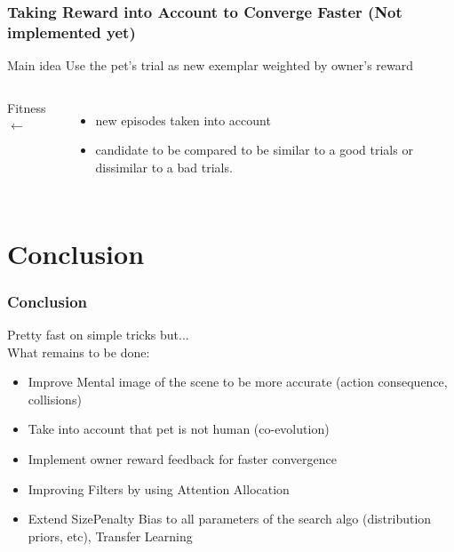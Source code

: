 \documentclass{beamer}
\begin{document}
\frame
{
  \frametitle{\alert{Taking Reward into Account} to Converge Faster
    (Not implemented yet)}

  \begin{beamerboxesrounded}{Main idea}
    Use the pet's trial as new \alert{exemplar weighted by owner's reward}
  \end{beamerboxesrounded}

  \begin{columns}
    \column{0.5in}
    Fitness
    \column{0.1in}
    $\leftarrow$
    \column{2.6in}
    \begin{itemize}
    \item new episodes taken into account
    \item candidate to be compared
      to be \alert{similar to a good trials} or 
      \alert{dissimilar to a bad trials}.
    \end{itemize}
  \end{columns}
}
\section{Conclusion}

\frame
{
  \frametitle{Conclusion}

  Pretty fast on simple tricks but...\\[2ex]

  What remains to be done:
  \begin{itemize}
  \item<+-> \alert{Improve Mental image of the scene} to be more accurate
    (action consequence, collisions)
  \item<+-> Take into account that \alert{pet is not human (co-evolution)}
  \item<+-> Implement owner reward feedback for faster convergence
  \item<+-> Improving Filters by using \alert{Attention Allocation}
  \item<+-> Extend SizePenalty Bias to all parameters of the search algo
    (distribution priors, etc), \alert{Transfer Learning}
  \end{itemize}
}
\end{document}
